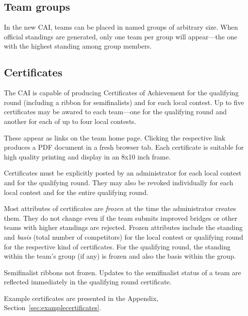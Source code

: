 \documentclass[11pt,letterpaper]{refart}
\begin{document}
\subsection{Team groups}
In the new CAI, teams can be placed in named groups of arbitrary
size. When official standings are generated, only one team per group
will appear---the one with the highest standing among group members.

\subsection{Certificates}
\label{sec:certificates}
The CAI is capable of producing Certificates of Achievement for the
qualifying round (including a ribbon for semifinalists) and for each
local contest.  Up to five certificates may be awared to each
team---one for the qualifying round and another for each of up to four
local contests.

These appear as links on the team home page. Clicking the respective
link produces a PDF document in a fresh browser tab. Each certificate
is suitable for high quality printing and display in an 8x10 inch
frame.

Certificates must be explicitly posted by an administrator for each
local contest and for the qualifying round. They may also be revoked
individually for each local contest and for the entire qualifying
round.

Most attributes of certificates are \emph{frozen} at the time the
administrator creates them. They do not change even if the team
submits improved bridges or other teams with higher standings are
rejected. Frozen attributes include the standing and \emph{basis}
(total number of competitors) for the local contest or qualifying
round for the respective kind of certificates. For the qualifying
round, the standing within the team's group (if any) is frozen and
also the basis within the group.

Semifinalist ribbons not frozen. Updates to the semifinalist status of
a team are reflected immediately in the qualifying round certificate.

Example certificates are presented in the Appendix,
Section~\ref{sec:examplecertificates}.
\end{document}
